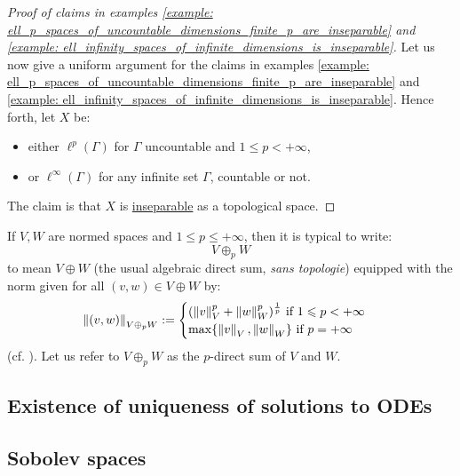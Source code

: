         \begin{proof}[Proof of claims in examples \ref{example: ell_p_spaces_of_uncountable_dimensions_finite_p_are_inseparable} and \ref{example: ell_infinity_spaces_of_infinite_dimensions_is_inseparable}]
            Let us now give a uniform argument for the claims in examples \ref{example: ell_p_spaces_of_uncountable_dimensions_finite_p_are_inseparable} and \ref{example: ell_infinity_spaces_of_infinite_dimensions_is_inseparable}. Hence forth, let $X$ be:
            \begin{itemize}
                \item either $\ell^p(\Gamma)$ for $\Gamma$ uncountable and $1 \leq p < +\infty$,
                \item or $\ell^{\infty}(\Gamma)$ for any infinite set $\Gamma$, countable or not.
            \end{itemize}
            The claim is that $X$ is \underline{inseparable} as a topological space.

        \end{proof}


        \begin{convention}
            If $V, W$ are normed spaces and $1 \leq p \leq +\infty$, then it is typical to write:
                $$V \oplus_p W$$
            to mean $V \oplus W$ (the usual algebraic direct sum, \textit{sans topologie}) equipped with the norm given for all $(v, w) \in V \oplus W$ by:
                $$
                    \left\| {(v, w)} \right\|_{V \oplus_p W} :=
                    \begin{cases}
                        \text{$(\left\| {v} \right\|_V^p + \left\| {w} \right\|_W^p)^{\frac1p}$ if $1 \leqslant p < +\infty$}
                        \\
                        \text{$\max\{ \left\| {v} \right\|_V, \left\| {w} \right\|_W \}$ if $p = +\infty$}
                    \end{cases}
                $$
            (cf. \cite[Example, p. 24]{litvak_functional_analysis_notes}). Let us refer to $V \oplus_p W$ as the $p$-direct sum of $V$ and $W$.
        \end{convention}

    \subsection{Existence of uniqueness of solutions to ODEs}

    \subsection{Sobolev spaces}